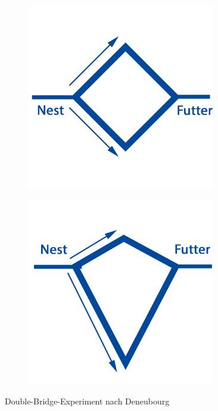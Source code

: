 \documentclass[doktyp=barbeit, sprache=german]{TUBAFarbeiten}
\begin{document}
\begin{figure}
\captionsetup[subfigure]{justification=centering}
\centering
\begin{subfigure}[c]{0.45\textwidth}
\includegraphics[width=0.9\textwidth]{images/RouteTrivial.png}
\end{subfigure}
\begin{subfigure}[c]{0.45\textwidth}
\includegraphics[width=0.9\textwidth]{images/RouteAdv.png}
\end{subfigure}
\caption[Double-Bridge-Experiment nach Deneubourg]{Double-Bridge-Experiment nach Deneubourg \cite{Biological}}
\label{img:DBExperiment}
\end{figure}
\end{document}

